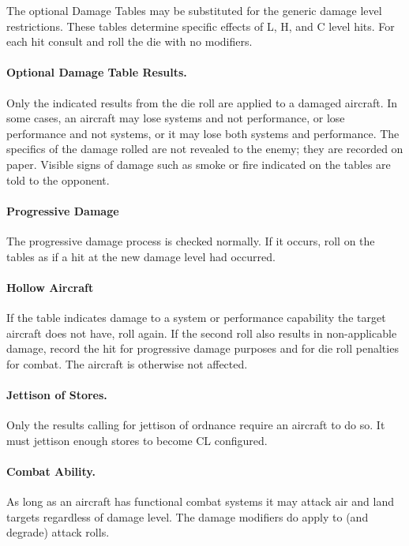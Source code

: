 \begin{advancedrules}
The optional Damage Tables may be substituted for the generic damage level restrictions. These tables determine specific effects of L, H, and C level hits. For each hit consult  and roll the die with no modifiers. 

\paragraph{Optional Damage Table Results.} Only the indicated results from the die roll are applied to a damaged aircraft. In some cases, an aircraft may lose systems and not performance, or lose performance and not systems, or it may lose both systems and performance. The specifics of the damage rolled are not revealed to the enemy; they are recorded on paper. Visible signs of damage such as smoke or fire indicated on the tables are told to the opponent.

\paragraph{Progressive Damage} The progressive damage process is checked normally. If it occurs, roll on the tables as if a hit at the new damage level had occurred.

\paragraph{Hollow Aircraft} If the table indicates damage to a system or performance capability the target aircraft does not have, roll again. If the second roll also results in non-applicable damage, record the hit for progressive damage purposes and for die roll penalties for combat. The aircraft is otherwise not affected.

\paragraph{Jettison of Stores.} Only the results calling for jettison of ordnance require an aircraft to do so. It must jettison enough stores to become CL configured.

\paragraph{Combat Ability.} As long as an aircraft has functional combat systems it may attack air and land targets regardless of damage level. The damage modifiers do apply to (and degrade) attack rolls.


\end{advancedrules}
